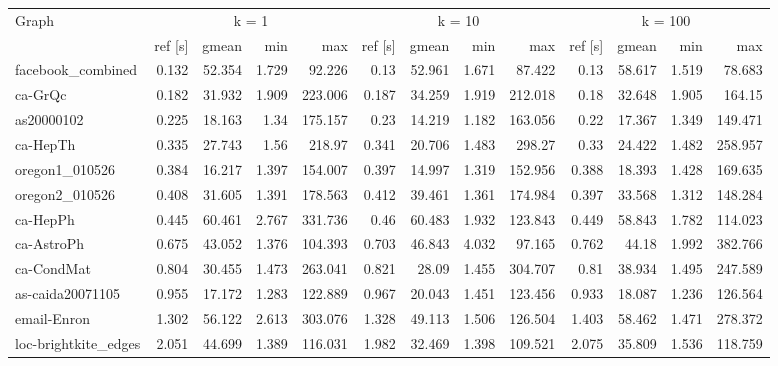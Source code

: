 \begin{landscape}

\begin{table}[h]
\centering
\begin{tabular}{l|rrrr|rrrr|rrrr}
\toprule
Graph & \multicolumn{4}{c|}{k = 1} & \multicolumn{4}{c|}{k = 10} & \multicolumn{4}{c}{k = 100}\\
                &     ref [s] &   gmean &   min &     max &     ref [s] &   gmean &   min &     max &     ref [s] &   gmean &   min &     max \\
\midrule \midrule
 facebook\_combined    &   0.132 &  52.354 & 1.729 &  92.226 &   0.13  &  52.961 & 1.671 &  87.422 &   0.13  &  58.617 & 1.519 &  78.683 \\
 ca-GrQc              &   0.182 &  31.932 & 1.909 & 223.006 &   0.187 &  34.259 & 1.919 & 212.018 &   0.18  &  32.648 & 1.905 & 164.15  \\
 as20000102           &   0.225 &  18.163 & 1.34  & 175.157 &   0.23  &  14.219 & 1.182 & 163.056 &   0.22  &  17.367 & 1.349 & 149.471 \\
 ca-HepTh             &   0.335 &  27.743 & 1.56  & 218.97  &   0.341 &  20.706 & 1.483 & 298.27  &   0.33  &  24.422 & 1.482 & 258.957 \\
 oregon1\_010526       &   0.384 &  16.217 & 1.397 & 154.007 &   0.397 &  14.997 & 1.319 & 152.956 &   0.388 &  18.393 & 1.428 & 169.635 \\
 oregon2\_010526       &   0.408 &  31.605 & 1.391 & 178.563 &   0.412 &  39.461 & 1.361 & 174.984 &   0.397 &  33.568 & 1.312 & 148.284 \\
 ca-HepPh             &   0.445 &  60.461 & 2.767 & 331.736 &   0.46  &  60.483 & 1.932 & 123.843 &   0.449 &  58.843 & 1.782 & 114.023 \\
 ca-AstroPh           &   0.675 &  43.052 & 1.376 & 104.393 &   0.703 &  46.843 & 4.032 &  97.165 &   0.762 &  44.18  & 1.992 & 382.766 \\
 ca-CondMat           &   0.804 &  30.455 & 1.473 & 263.041 &   0.821 &  28.09  & 1.455 & 304.707 &   0.81  &  38.934 & 1.495 & 247.589 \\
 as-caida20071105     &   0.955 &  17.172 & 1.283 & 122.889 &   0.967 &  20.043 & 1.451 & 123.456 &   0.933 &  18.087 & 1.236 & 126.564 \\
 email-Enron          &   1.302 &  56.122 & 2.613 & 303.076 &   1.328 &  49.113 & 1.506 & 126.504 &   1.403 &  58.462 & 1.471 & 278.372 \\
 loc-brightkite\_edges &   2.051 &  44.699 & 1.389 & 116.031 &   1.982 &  32.469 & 1.398 & 109.521 &   2.075 &  35.809 & 1.536 & 118.759 \\

\end{tabular}
\end{table}
\end{landscape}
